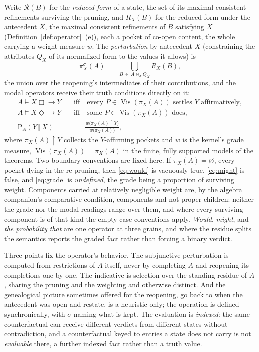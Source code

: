 \noindent Write $\mathcal{R}(B)$ for the \emph{reduced form} of a state, the set of its maximal consistent refinements surviving the pruning, and $R_X(B)$ for the reduced form under the antecedent $X$, the maximal consistent refinements of $B$ satisfying $X$ (Definition~\ref{def:operator}~(e)), each a pocket of co-open content, the whole carrying a weight measure $w$. The \emph{perturbation} by antecedent $X$ (constraining the attributes $Q_X$ of its normalized form to the values it allows) is \begin{equation}\label{eq:pi} \pi^{\sigma}_X(A) \;=\; \bigcup_{B \,\in\, A \ominus_{\sigma} Q_X} R_X(B), \end{equation} the union over the reopening's intermediates of their contributions, and the modal operators receive their truth conditions directly on it: \begin{align} A \models X \mathrel{\Box\!\!\rightarrow} Y \quad &\text{iff} \quad \text{every } P \in \operatorname{Vis}(\pi_X(A)) \text{ settles } Y \text{ affirmatively}, \label{eq:would}\\ A \models X \mathrel{\Diamond\!\!\rightarrow} Y \quad &\text{iff} \quad \text{some } P \in \operatorname{Vis}(\pi_X(A)) \text{ does}, \label{eq:might}\\ \mathrm{P}_A(Y \,\Vert\, X) \;&=\; \frac{w\big(\pi_X(A) \restriction Y\big)}{w\big(\pi_X(A)\big)}, \label{eq:grade} \end{align} where $\pi_X(A) \restriction Y$ collects the $Y$-affirming pockets and $w$ is the kernel's grade measure, $\operatorname{Vis}(\pi_X(A)) = \pi_X(A)$ in the finite, fully supported models of the theorems. Two boundary conventions are fixed here. If $\pi_X(A) = \varnothing$, every pocket dying in the re-pruning, then \eqref{eq:would} is vacuously true, \eqref{eq:might} is false, and \eqref{eq:grade} is \emph{undefined}, the grade being a proportion of surviving weight. Components carried at relatively negligible weight are, by the algebra companion's comparative condition, components and not proper children: neither the grade nor the modal readings range over them, and where every surviving component is of that kind the empty-case conventions apply. \emph{Would}, \emph{might}, and \emph{the probability that} are one operator at three grains, and where the residue splits the semantics reports the graded fact rather than forcing a binary verdict.

Three points fix the operator's behavior. The subjunctive perturbation is computed from restrictions of $A$ itself, never by completing $A$ and reopening its completions one by one. The indicative is selection over the standing residue of $A$, sharing the pruning and the weighting and otherwise distinct. And the genealogical picture sometimes offered for the reopening, go back to when the antecedent was open and restate, is a heuristic only; the operation is defined synchronically, with $\sigma$ naming what is kept. The evaluation is \emph{indexed}: the same counterfactual can receive different verdicts from different states without contradiction, and a counterfactual keyed to entries a state does not carry is not \emph{evaluable} there, a further indexed fact rather than a truth value.

